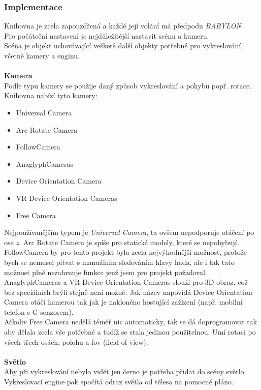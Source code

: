 \documentclass[a4paper,titlepage]{article}
\begin{document}
	\subsubsection{Implementace}
		Knihovna je zcela zapouzdřená a každé její volání má předpodu \textit{BABYLON}.\\
		Pro počáteční nastavení je nejdůležitější nastavit scénu a kameru.\\
		Scéna je objekt uchovávající veškeré další objekty potřebné pro vykreslování, včetně kamery a enginu.\\
		\\
		\textbf{Kamera}\\
			Podle typu kamery se použije daný způsob vykreslování a pohybu popř. rotace. Knihovna nabízí tyto kamery:
			\begin{itemize}
			\item Universal Camera
			\item Arc Rotate Camera
			\item FollowCamera
			\item AnaglyphCameras
			\item Device Orientation Camera
			\item VR Device Orientation Cameras
			\item Free Camera
			\end{itemize}
			Nejpoužívanějším typem je \textit{Univerzal Camera}, ta ovšem nepodporuje otáčení po ose \textit{z}.
			Arc Rotate Camera je spíše pro statické modely, které se nepohybují. FollowCamera by pro tento projekt byla zcela
			nejvýhodnější možnost, protože bych se nemusel pitvat s manuálním sledováním hlavy hada, ale
			i tak tato možnost plně nezahrnuje funkce jenž jsem pro projekt požadoval.
			AnaglyphCameras a VR Device Orientation Cameras slouží pro 3D obraz, což bez speciálních brýlí stejně není možné.
			Jak název napovídá Device Orientation Camera otáčí kamerou tak jak je nakloněno hostující zažízení
			(např. mobilní telefon s G-senzorem).\\
			Ačkoliv Free Camera nedělá téměř nic automaticky, tak se dá doprogramovat tak aby dělala zcela vše potřebné
			a tudíž se stala jedinou použitelnou. Umí rotaci po všech třech osách, polohu a fov (field of view)\cite{field of view}.\\
			\\
		\textbf{Světlo}\\
			Aby při vykreslování nebylo vidět jen černo je potřeba přidat do scény světlo.
			Vykreslovací engine pak spočítá odraz světla od tělesa na pomocné pláno.
\end{document}
